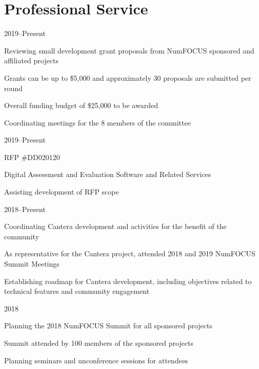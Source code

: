 \vspace{\baselineskip}

\section{{\sectionfont Professional Service}}

\begin{lonelist}
\item[]  \hfill 2019--Present\\
\begin{innerlist}
    \item Reviewing small development grant proposals from NumFOCUS sponsored and affiliated projects
    \item Grants can be up to \$5,000 and approximately 30 proposals are submitted per round
    \item Overall funding budget of \$25,000 to be awarded
    \item Coordinating meetings for the 8 members of the committee
\end{innerlist}
\item[]  \hfill 2019--Present\\
\begin{innerlist}
    \item RFP \#DD020120
    \item Digital Assessment and Evaluation Software and Related Services
    \item Assisting development of RFP scope
\end{innerlist}
\item[]  \hfill 2018--Present\\

\begin{innerlist}
    \item Coordinating Cantera development and activities for the benefit of the community
    \item As representative for the Cantera project, attended 2018 and 2019 NumFOCUS Summit Meetings
    \item Establishing roadmap for Cantera development, including objectives related to technical features and community engagement
\end{innerlist}

\item[]  \hfill 2018\\
\begin{innerlist}
    \item Planning the 2018 NumFOCUS Summit for all sponsored projects
    \item Summit attended by 100 members of the sponsored projects
    \item Planning seminars and unconference sessions for attendees
\end{innerlist}


\end{lonelist}
